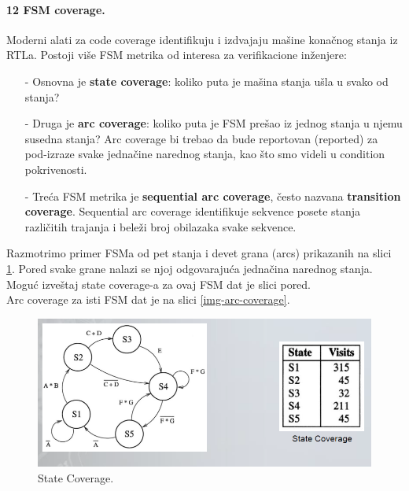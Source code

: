 \documentclass[a4paper, 12pt]{article}
\begin{document}
\paragraph{12 FSM coverage.}
\hfill \break
\indent Moderni alati za code coverage identifikuju i izdvajaju mašine konačnog stanja iz RTLa. Postoji više FSM metrika od interesa za verifikacione inženjere:
\begin{itemize}
\item[-] Osnovna je \textbf{state coverage}: koliko puta je mašina stanja ušla u svako od stanja?
\item[-] Druga je \textbf{arc coverage}: koliko puta je FSM prešao iz jednog stanja u njemu susedna stanja? Arc coverage bi trebao da bude reportovan (reported) za pod-izraze svake jednačine narednog stanja, kao što smo videli u condition pokrivenosti.
\item[-] Treća FSM metrika je \textbf{sequential arc coverage}, često nazvana \textbf{transition coverage}. Sequential arc coverage identifikuje sekvence posete stanja različitih trajanja i beleži broj obilazaka svake sekvence.
\end{itemize}
\indent Razmotrimo primer FSMa od pet stanja i devet grana (arcs) prikazanih na slici \ref{img-state-coverage}. Pored svake grane nalazi se njoj odgovarajuća jednačina narednog stanja. Moguć izveštaj state coverage-a za ovaj FSM dat je slici pored.\\
\indent Arc coverage za isti FSM dat je na slici \ref{img-arc-coverage}.\\

\begin{figure}[h!]
\centering
\includegraphics[scale=0.5]{img-state-coverage.png}
\caption{State Coverage.}
\label{img-state-coverage}
\end{figure}
\end{document}
